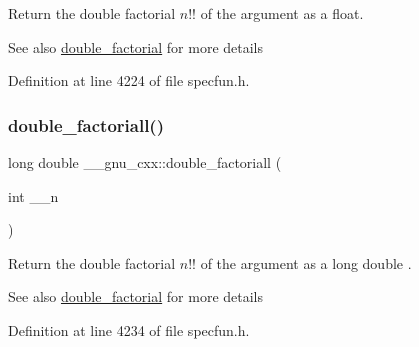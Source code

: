 Return the double factorial $ n!! $ of the argument as a {\ttfamily float}.

\begin{DoxySeeAlso}{See also}
\hyperlink{group__gnu__math__spec__func_ga1e62c47f84f9782828f8830b4fedc13c}{double\+\_\+factorial} for more details 
\end{DoxySeeAlso}


Definition at line 4224 of file specfun.\+h.

\mbox{\label{group__gnu__math__spec__func_ga0366730a4a775256217ef1cd9d0c3a04}} 
\subsubsection{\texorpdfstring{double\+\_\+factoriall()}{double\_factoriall()}}
{\footnotesize\ttfamily long double \+\_\+\+\_\+gnu\+\_\+cxx\+::double\+\_\+factoriall (\begin{DoxyParamCaption}\item[{int}]{\+\_\+\+\_\+n }\end{DoxyParamCaption})\hspace{0.3cm}{\ttfamily [inline]}}

Return the double factorial $ n!! $ of the argument as a {\ttfamily  long double }.

\begin{DoxySeeAlso}{See also}
\hyperlink{group__gnu__math__spec__func_ga1e62c47f84f9782828f8830b4fedc13c}{double\+\_\+factorial} for more details 
\end{DoxySeeAlso}


Definition at line 4234 of file specfun.\+h.

\mbox{\label{group__gnu__math__spec__func_ga6e44a0d90500e56ef4b3aba6efd7e2b0}} 
